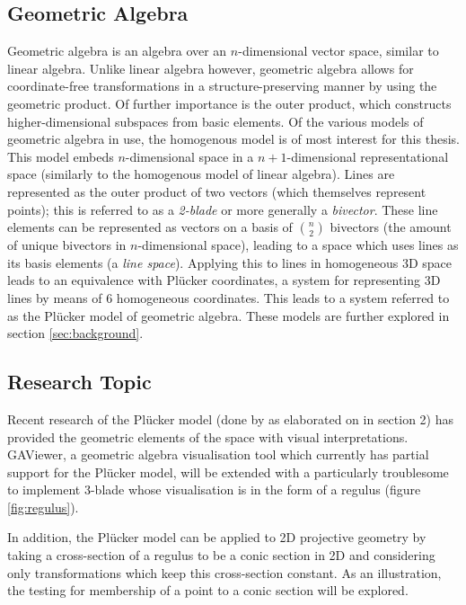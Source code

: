 \documentclass[a4paper, 10pt]{article}
\begin{document}
\subsection{Geometric Algebra}
Geometric algebra\cite{dorst2009geometric} is an algebra over an $n$-dimensional
vector space, similar to
linear algebra. Unlike linear algebra however, geometric algebra allows for
coordinate-free transformations in a structure-preserving manner by using the
geometric product. Of further importance is the outer product, which constructs
higher-dimensional subspaces from basic elements. Of the various models of
geometric algebra in use, the homogenous model is of most interest for this thesis.
This model embeds $n$-dimensional space in a $n + 1$-dimensional representational
space (similarly to the homogenous model of linear algebra).  Lines are
represented as the outer product of two vectors (which themselves represent
points); this is referred to as a \emph{2-blade} or more generally a
\emph{bivector}. These line elements can be represented as vectors on a basis of
$n \choose 2$ bivectors (the amount of unique bivectors in $n$-dimensional
space), leading to a space which uses lines as its basis elements (a \emph{line
space}). Applying this to lines in homogeneous 3D space leads to an equivalence
with Pl\"{u}cker coordinates, a system for representing 3D lines by means of 6
homogeneous coordinates. This leads to a system referred to as the Pl\"{u}cker
model of geometric algebra. These models are further explored in section
\ref{sec:background}.

\subsection{Research Topic}
Recent research of the Pl\"{u}cker model (done by \cite{hangbo2011}
\cite{dorst2013versors} \cite{pottmann2001computational} \cite{dekok2012} as
elaborated on in section 2) has provided the geometric elements of the space
with visual interpretations. GAViewer, a geometric algebra visualisation tool
which currently has partial support for the Pl\"{u}cker model, will be extended
with a particularly troublesome to implement 3-blade whose visualisation is in
the form of a regulus (figure \ref{fig:regulus}).

In addition, the Pl\"{u}cker model can be applied to 2D projective geometry by
taking a cross-section of a regulus to be a conic section in 2D and considering
only transformations which keep this cross-section constant. 
As an illustration, the testing for membership of a point to a conic section
will be explored.
\end{document}
